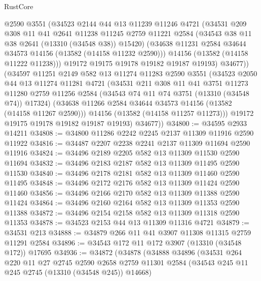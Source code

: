 \begin{lexlean}{RustCore}
\begin{coremodule}
          @2590
          @3551
          (@34523
            @2144
            @44
            @13
            @11239
            @11246
            @4721
            (@34531
              @209
              @308
              @11
              @41
              @2641
              @11238
              @11245
              @2759
              @11221
              @2584
              (@34543 @38 @11 @38 @2641 (@13310 (@34548 @38)) @15420)
              (@34638 @11231 @2584 @34644 @34573 @14156 (@13582 (@14158 @11232 @2590)))
              @14156
              (@13582 (@14158 @11222 @11238)))
            @19172
            @19175
            @19178
            @19182
            @19187
            @19193)
          @34677))
      (@34597
        @11251
        @2149
        @582
        @13
        @11274
        @11283
        @2590
        @3551
        (@34523
          @2050
          @44
          @13
          @11274
          @11281
          @4721
          (@34531
            @211
            @308
            @11
            @41
            @3751
            @11273
            @11280
            @2759
            @11256
            @2584
            (@34543 @74 @11 @74 @3751 (@13310 (@34548 @74)) @17324)
            (@34638 @11266 @2584 @34644 @34573 @14156 (@13582 (@14158 @11267 @2590)))
            @14156
            (@13582 (@14158 @11257 @11273)))
          @19172
          @19175
          @19178
          @19182
          @19187
          @19193)
        @34677))
@34800 := @34595 @2933 @14211
@34808 := @34800 @11286 @2242 @2245 @2137 @11309 @11916 @2590 @11922
@34816 := @34487 @2207 @2238 @2241 @2137 @11309 @11694 @2590 @11916
@34824 := @34496 @2189 @2205 @582 @13 @11309 @11530 @2590 @11694
@34832 := @34496 @2183 @2187 @582 @13 @11309 @11495 @2590 @11530
@34840 := @34496 @2178 @2181 @582 @13 @11309 @11460 @2590 @11495
@34848 := @34496 @2172 @2176 @582 @13 @11309 @11424 @2590 @11460
@34856 := @34496 @2166 @2170 @582 @13 @11309 @11388 @2590 @11424
@34864 := @34496 @2160 @2164 @582 @13 @11309 @11353 @2590 @11388
@34872 := @34496 @2154 @2158 @582 @13 @11309 @11318 @2590 @11353
@34878 := @34523 @2153 @44 @13 @11309 @11316 @4721
@34879 := @34531 @213
@34888 := @34879 @266 @11 @41 @3907 @11308 @11315 @2759 @11291 @2584
@34896 := @34543 @172 @11 @172 @3907 (@13310 (@34548 @172)) @17695
@34936 := @34872
    (@34878
      (@34888
        @34896
        (@34531
          @264
          @220
          @11
          @27
          @2745
          @2590
          @2658
          @2759
          @11301
          @2584
          (@34543 @245 @11 @245 @2745 (@13310 (@34548 @245)) @14668)

\end{coremodule}
\end{lexlean}
